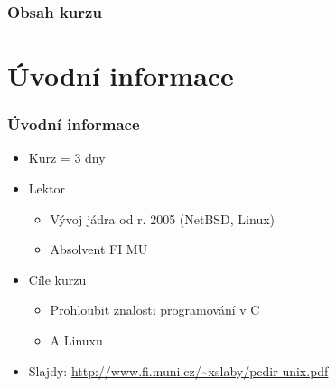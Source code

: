 


\pcdirlinuxtrue

\date{3--5. 1. \the\year}



\frame{\titlepage}


\begin{frame}
  \frametitle{Obsah kurzu}
  \tableofcontents
\end{frame}

\section{Úvodní informace}
\frame{\sectionpage}

\begin{frame}
  \frametitle{Úvodní informace}
  \begin{itemize}
    \item Kurz = 3 dny

    \pause

    \item Lektor
    \begin{itemize}
      \item Vývoj jádra od r. 2005 (NetBSD, Linux)
      \item Absolvent FI MU
    \end{itemize}

    \pause

    \item Cíle kurzu
    \begin{itemize}
      \item Prohloubit znalosti programování v C
      \item A Linuxu
    \end{itemize}

    \pause

    \item Slajdy: \url{http://www.fi.muni.cz/~xslaby/pcdir-unix.pdf}

  \end{itemize}

\end{frame}

